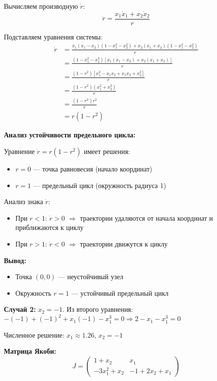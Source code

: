 Вычисляем производную $\dot{r}$:
$$\dot{r} = \frac{x_1\dot{x}_1 + x_2\dot{x}_2}{r}$$

Подставляем уравнения системы:
\begin{align}
\dot{r} &= \frac{x_1(x_1 - x_2)(1 - x_1^2 - x_2^2) + x_2(x_1 + x_2)(1 - x_1^2 - x_2^2)}{r} \\\
&= \frac{(1 - x_1^2 - x_2^2)[x_1(x_1 - x_2) + x_2(x_1 + x_2)]}{r} \\\
&= \frac{(1 - r^2)[x_1^2 - x_1x_2 + x_1x_2 + x_2^2]}{r} \\\
&= \frac{(1 - r^2)(x_1^2 + x_2^2)}{r} \\\
&= \frac{(1 - r^2)r^2}{r} \\\
&= r(1 - r^2)
\end{align}

\textbf{Анализ устойчивости предельного цикла:}

Уравнение $\dot{r} = r(1 - r^2)$ имеет решения:
\begin{itemize}
\item $r = 0$ --- точка равновесия (начало координат)
\item $r = 1$ --- предельный цикл (окружность радиуса 1)
\end{itemize}

Анализ знака $\dot{r}$:
\begin{itemize}
\item При $r < 1$: $\dot{r} > 0$ $\Rightarrow$ траектории удаляются от начала координат и приближаются к циклу
\item При $r > 1$: $\dot{r} < 0$ $\Rightarrow$ траектории движутся к циклу
\end{itemize}

\textbf{Вывод:}
\begin{itemize}
\item Точка $(0,0)$ --- неустойчивый узел
\item Окружность $r = 1$ --- устойчивый предельный цикл
\end{itemize}

\textbf{Случай 2:} $x_2 = -1$. Из второго уравнения: $-(-1) + (-1)^2 + x_1(-1) - x_1^3 = 0 \Rightarrow 2 - x_1 - x_1^3 = 0$

Численное решение: $x_1 \approx 1.26$, $x_2 = -1$

\textbf{Матрица Якоби:}
$$J = \begin{pmatrix} 1 + x_2 & x_1 \\ -3x_1^2 + x_2 & -1 + 2x_2 + x_1 \end{pmatrix}$$

